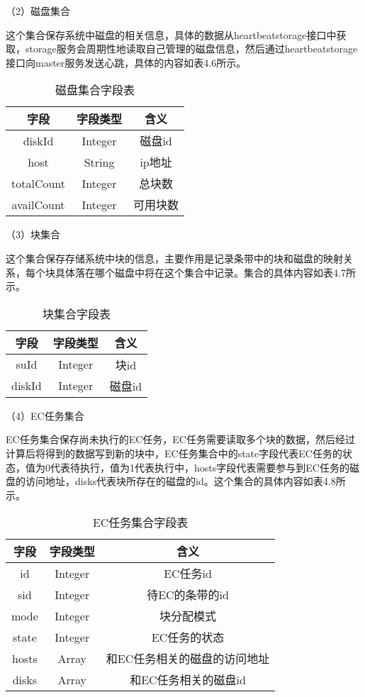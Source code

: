 （2）磁盘集合

这个集合保存系统中磁盘的相关信息，具体的数据从heartbeatstorage接口中获取，storage服务会周期性地读取自己管理的磁盘信息，然后通过heartbeatstorage接口向master服务发送心跳，具体的内容如表4.6所示。

\begin{table}[h]
  \centering
  \caption{磁盘集合字段表}
  \begin{tabular}{ccc}
    \toprule
    字段   & 字段类型   & 含义          \\
    \midrule
    diskId     & Integer   & 磁盘id    \\
    host       & String    & ip地址    \\
    totalCount & Integer   & 总块数    \\
    availCount & Integer   & 可用块数  \\
    \bottomrule
  \end{tabular}
\end{table}

（3）块集合

这个集合保存存储系统中块的信息，主要作用是记录条带中的块和磁盘的映射关系，每个块具体落在哪个磁盘中将在这个集合中记录。集合的具体内容如表4.7所示。

\begin{table}[h]
    \centering
    \caption{块集合字段表}
    \begin{tabular}{ccc}
      \toprule
      字段   & 字段类型   & 含义                   \\
      \midrule
      suId     & Integer   & 块id                 \\
      diskId   & Integer   & 磁盘id                \\
      \bottomrule
    \end{tabular}
\end{table}

（4）EC任务集合

EC任务集合保存尚未执行的EC任务，EC任务需要读取多个块的数据，然后经过计算后将得到的数据写到新的块中，EC任务集合中的state字段代表EC任务的状态，值为0代表待执行，值为1代表执行中，hosts字段代表需要参与到EC任务的磁盘的访问地址，disks代表块所存在的磁盘的id。这个集合的具体内容如表4.8所示。

\begin{table}[h]
    \centering
    \caption{EC任务集合字段表}
    \begin{tabular}{ccc}
      \toprule
      字段   & 字段类型   & 含义                          \\
      \midrule
      id     & Integer & EC任务id                 \\
      sid    & Integer & 待EC的条带的id                \\
      mode   & Integer & 块分配模式                 \\
      state  & Integer & EC任务的状态                \\
      hosts  & Array   & 和EC任务相关的磁盘的访问地址  \\
      disks  & Array   & 和EC任务相关的磁盘id         \\
      \bottomrule
    \end{tabular}
\end{table}


